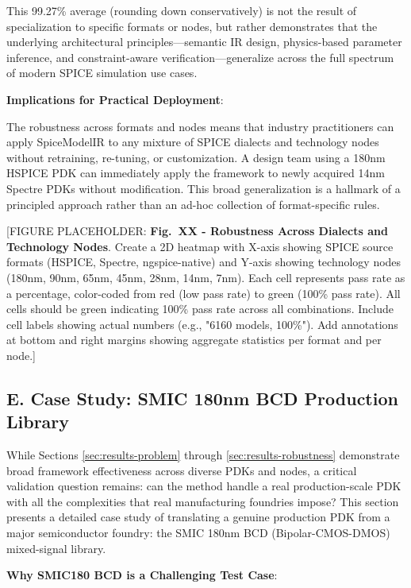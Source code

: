 \documentclass[conference]{IEEEtran}
\begin{document}
This 99.27\% average (rounding down conservatively) is not the result of specialization to specific formats or nodes, but rather demonstrates that the underlying architectural principles---semantic IR design, physics-based parameter inference, and constraint-aware verification---generalize across the full spectrum of modern SPICE simulation use cases.

\textbf{Implications for Practical Deployment}:

The robustness across formats and nodes means that industry practitioners can apply SpiceModelIR to any mixture of SPICE dialects and technology nodes without retraining, re-tuning, or customization. A design team using a 180nm HSPICE PDK can immediately apply the framework to newly acquired 14nm Spectre PDKs without modification. This broad generalization is a hallmark of a principled approach rather than an ad-hoc collection of format-specific rules.

[FIGURE PLACEHOLDER: \textbf{Fig.~XX - Robustness Across Dialects and Technology Nodes}. Create a 2D heatmap with X-axis showing SPICE source formats (HSPICE, Spectre, ngspice-native) and Y-axis showing technology nodes (180nm, 90nm, 65nm, 45nm, 28nm, 14nm, 7nm). Each cell represents pass rate as a percentage, color-coded from red (low pass rate) to green (100\% pass rate). All cells should be green indicating 100\% pass rate across all combinations. Include cell labels showing actual numbers (e.g., "6160 models, 100\%"). Add annotations at bottom and right margins showing aggregate statistics per format and per node.]

\subsection{E. Case Study: SMIC 180nm BCD Production Library}
\label{sec:results-casestudy}

While Sections \ref{sec:results-problem} through \ref{sec:results-robustness} demonstrate broad framework effectiveness across diverse PDKs and nodes, a critical validation question remains: can the method handle a real production-scale PDK with all the complexities that real manufacturing foundries impose? This section presents a detailed case study of translating a genuine production PDK from a major semiconductor foundry: the SMIC 180nm BCD (Bipolar-CMOS-DMOS) mixed-signal library.

\textbf{Why SMIC180 BCD is a Challenging Test Case}:
\end{document}
